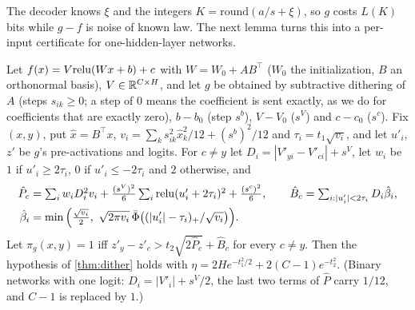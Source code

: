 The decoder knows $\xi$ and the integers $K=\mathrm{round}(a/s+\xi)$, so $g$ costs $L(K)$ bits while $g-f$ is noise of known law. The next lemma turns this into a per-input certificate for one-hidden-layer networks.

\begin{lemma}\label{lem:cert}
Let $f(x)=V\mathrm{relu}(Wx+b)+c$ with $W=W_0+AB^\top$ ($W_0$ the initialization, $B$ an orthonormal basis), $V\in\mathbb{R}^{C\times H}$, and let $g$ be obtained by subtractive dithering of $A$ (steps $s_{ik}\ge0$; a step of $0$ means the coefficient is sent exactly, as we do for coefficients that are exactly zero), $b-b_0$ (step $s^b$), $V-V_0$ ($s^V$) and $c-c_0$ ($s^c$). Fix $(x,y)$, put $\hat x=B^\top x$, $v_i=\sum_ks_{ik}^2\hat x_k^2/12+(s^b)^2/12$ and $\tau_i=t_1\sqrt{v_i}$, and let $u'_i$, $z'$ be $g$'s pre-activations and logits. For $c\ne y$ let $D_i=|V'_{yi}-V'_{ci}|+s^V$, let $w_i$ be $1$ if $u'_i\ge2\tau_i$, $0$ if $u'_i\le-2\tau_i$ and $2$ otherwise, and
\begin{align*}
\hat P_c&=\textstyle\sum_iw_iD_i^2v_i+\frac{(s^V)^2}6\sum_i\mathrm{relu}(u'_i+2\tau_i)^2+\frac{(s^c)^2}6,\qquad
\hat B_c=\sum_{i:|u'_i|<2\tau_i}D_i\hat\beta_i,\\
\hat\beta_i&=\min\Big(\tfrac{\sqrt{v_i}}2,\ \sqrt{2\pi v_i}\,\bar\Phi\big((|u'_i|-\tau_i)_+/\sqrt{v_i}\big)\Big).
\end{align*}
Let $\pi_g(x,y)=1$ iff $z'_y-z'_c>t_2\sqrt{2\hat P_c}+\hat B_c$ for every $c\ne y$. Then the hypothesis of \cref{thm:dither} holds with $\eta=2He^{-t_1^2/2}+2(C-1)e^{-t_2^2}$. (Binary networks with one logit: $D_i=|V'_i|+s^V/2$, the last two terms of $\hat P$ carry $1/12$, and $C-1$ is replaced by $1$.)
\end{lemma}

